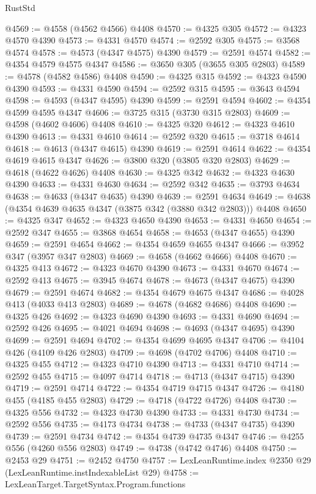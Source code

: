 \begin{lexlean}{RustStd}
\begin{coremodule}
@4569 := @4558 (@4562 @4566) @4408
@4570 := @4325 @305
@4572 := @4323 @4570 @4390
@4573 := @4331 @4570
@4574 := @2592 @305
@4575 := @3568 @4574
@4578 := @4573 (@4347 @4575) @4390
@4579 := @2591 @4574
@4582 := @4354 @4579 @4575 @4347
@4586 := @3650 @305 (@3655 @305 @2803)
@4589 := @4578 (@4582 @4586) @4408
@4590 := @4325 @315
@4592 := @4323 @4590 @4390
@4593 := @4331 @4590
@4594 := @2592 @315
@4595 := @3643 @4594
@4598 := @4593 (@4347 @4595) @4390
@4599 := @2591 @4594
@4602 := @4354 @4599 @4595 @4347
@4606 := @3725 @315 (@3730 @315 @2803)
@4609 := @4598 (@4602 @4606) @4408
@4610 := @4325 @320
@4612 := @4323 @4610 @4390
@4613 := @4331 @4610
@4614 := @2592 @320
@4615 := @3718 @4614
@4618 := @4613 (@4347 @4615) @4390
@4619 := @2591 @4614
@4622 := @4354 @4619 @4615 @4347
@4626 := @3800 @320 (@3805 @320 @2803)
@4629 := @4618 (@4622 @4626) @4408
@4630 := @4325 @342
@4632 := @4323 @4630 @4390
@4633 := @4331 @4630
@4634 := @2592 @342
@4635 := @3793 @4634
@4638 := @4633 (@4347 @4635) @4390
@4639 := @2591 @4634
@4649 := @4638 (@4354 @4639 @4635 @4347 (@3875 @342 (@3880 @342 @2803))) @4408
@4650 := @4325 @347
@4652 := @4323 @4650 @4390
@4653 := @4331 @4650
@4654 := @2592 @347
@4655 := @3868 @4654
@4658 := @4653 (@4347 @4655) @4390
@4659 := @2591 @4654
@4662 := @4354 @4659 @4655 @4347
@4666 := @3952 @347 (@3957 @347 @2803)
@4669 := @4658 (@4662 @4666) @4408
@4670 := @4325 @413
@4672 := @4323 @4670 @4390
@4673 := @4331 @4670
@4674 := @2592 @413
@4675 := @3945 @4674
@4678 := @4673 (@4347 @4675) @4390
@4679 := @2591 @4674
@4682 := @4354 @4679 @4675 @4347
@4686 := @4028 @413 (@4033 @413 @2803)
@4689 := @4678 (@4682 @4686) @4408
@4690 := @4325 @426
@4692 := @4323 @4690 @4390
@4693 := @4331 @4690
@4694 := @2592 @426
@4695 := @4021 @4694
@4698 := @4693 (@4347 @4695) @4390
@4699 := @2591 @4694
@4702 := @4354 @4699 @4695 @4347
@4706 := @4104 @426 (@4109 @426 @2803)
@4709 := @4698 (@4702 @4706) @4408
@4710 := @4325 @455
@4712 := @4323 @4710 @4390
@4713 := @4331 @4710
@4714 := @2592 @455
@4715 := @4097 @4714
@4718 := @4713 (@4347 @4715) @4390
@4719 := @2591 @4714
@4722 := @4354 @4719 @4715 @4347
@4726 := @4180 @455 (@4185 @455 @2803)
@4729 := @4718 (@4722 @4726) @4408
@4730 := @4325 @556
@4732 := @4323 @4730 @4390
@4733 := @4331 @4730
@4734 := @2592 @556
@4735 := @4173 @4734
@4738 := @4733 (@4347 @4735) @4390
@4739 := @2591 @4734
@4742 := @4354 @4739 @4735 @4347
@4746 := @4255 @556 (@4260 @556 @2803)
@4749 := @4738 (@4742 @4746) @4408
@4750 := @2453 @29
@4751 := @2452 @4750
@4757 := LexLeanRuntime.index @2350 @29 (LexLeanRuntime.instIndexableList @29)
@4758 := LexLeanTarget.TargetSyntax.Program.functions

\end{coremodule}
\end{lexlean}

